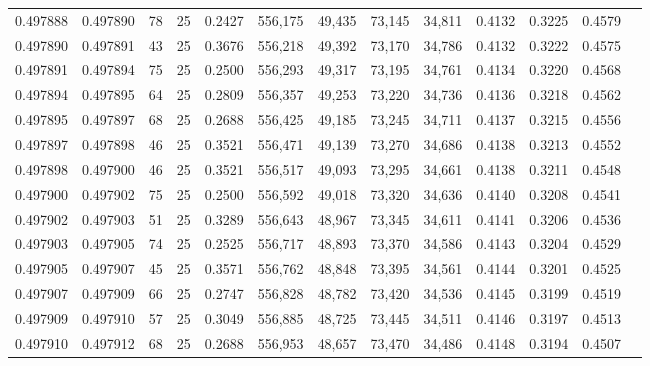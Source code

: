 \begin{tabular}{rrrrrrrrrrrrr}
0.497888 & 0.497890 &    78 &  25 &                                     0.2427 & 556,175 &  49,435 &  73,145 &  34,811 & 0.4132 & 0.3225 & 0.4579 \\
0.497890 & 0.497891 &    43 &  25 &                                     0.3676 & 556,218 &  49,392 &  73,170 &  34,786 & 0.4132 & 0.3222 & 0.4575 \\
0.497891 & 0.497894 &    75 &  25 &                                     0.2500 & 556,293 &  49,317 &  73,195 &  34,761 & 0.4134 & 0.3220 & 0.4568 \\
0.497894 & 0.497895 &    64 &  25 &                                     0.2809 & 556,357 &  49,253 &  73,220 &  34,736 & 0.4136 & 0.3218 & 0.4562 \\
0.497895 & 0.497897 &    68 &  25 &                                     0.2688 & 556,425 &  49,185 &  73,245 &  34,711 & 0.4137 & 0.3215 & 0.4556 \\
0.497897 & 0.497898 &    46 &  25 &                                     0.3521 & 556,471 &  49,139 &  73,270 &  34,686 & 0.4138 & 0.3213 & 0.4552 \\
0.497898 & 0.497900 &    46 &  25 &                                     0.3521 & 556,517 &  49,093 &  73,295 &  34,661 & 0.4138 & 0.3211 & 0.4548 \\
0.497900 & 0.497902 &    75 &  25 &                                     0.2500 & 556,592 &  49,018 &  73,320 &  34,636 & 0.4140 & 0.3208 & 0.4541 \\
0.497902 & 0.497903 &    51 &  25 &                                     0.3289 & 556,643 &  48,967 &  73,345 &  34,611 & 0.4141 & 0.3206 & 0.4536 \\
0.497903 & 0.497905 &    74 &  25 &                                     0.2525 & 556,717 &  48,893 &  73,370 &  34,586 & 0.4143 & 0.3204 & 0.4529 \\
0.497905 & 0.497907 &    45 &  25 &                                     0.3571 & 556,762 &  48,848 &  73,395 &  34,561 & 0.4144 & 0.3201 & 0.4525 \\
0.497907 & 0.497909 &    66 &  25 &                                     0.2747 & 556,828 &  48,782 &  73,420 &  34,536 & 0.4145 & 0.3199 & 0.4519 \\
0.497909 & 0.497910 &    57 &  25 &                                     0.3049 & 556,885 &  48,725 &  73,445 &  34,511 & 0.4146 & 0.3197 & 0.4513 \\
0.497910 & 0.497912 &    68 &  25 &                                     0.2688 & 556,953 &  48,657 &  73,470 &  34,486 & 0.4148 & 0.3194 & 0.4507 \\

\end{tabular}
